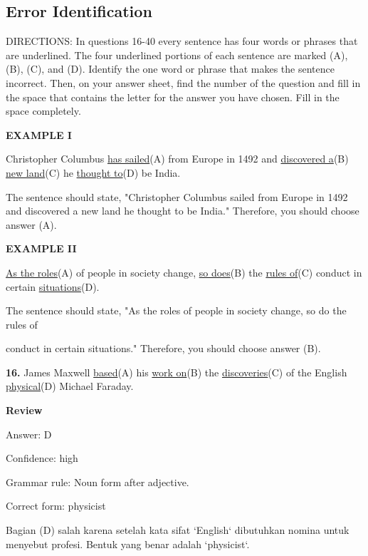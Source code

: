 \documentclass[12pt]{article}
\begin{document}
\subsection*{Error Identification}
DIRECTIONS: In questions 16-40 every sentence has four words or phrases that are underlined. The four underlined portions of each sentence are marked (A), (B), (C), and (D). Identify the one word or phrase that makes the sentence incorrect. Then, on your answer sheet, find the number of the question and fill in the space that contains the letter for the answer you have chosen. Fill in the space completely.\par
\begin{exampleblock}
\textbf{EXAMPLE I}\par
Christopher Columbus \uline{has sailed}(A) from Europe in 1492 and \uline{discovered a}(B) \uline{new land}(C) he \uline{thought to}(D) be India.\par
The sentence should state, "Christopher Columbus sailed from Europe in 1492 and discovered a new land he thought to be India." Therefore, you should choose answer (A).\par
\end{exampleblock}
\begin{exampleblock}
\textbf{EXAMPLE II}\par
\uline{As the roles}(A) of people in society change, \uline{so does}(B) the \uline{rules of}(C) conduct in certain \uline{situations}(D).\par
The sentence should state, "As the roles of people in society change, so do the rules of\par
conduct in certain situations." Therefore, you should choose answer (B).\par
\end{exampleblock}
\noindent\textbf{16.} James Maxwell \uline{based}(A) his \uline{work on}(B) the \uline{discoveries}(C) of the English \uline{physical}(D) Michael Faraday.
\par
\begingroup
\setlength{\parskip}{0pt}
\setlength{\parindent}{0pt}
\textbf{Review}\par
Answer: D\par
Confidence: high\par
Grammar rule: Noun form after adjective.\par
Correct form: physicist\par
Bagian (D) salah karena setelah kata sifat `English` dibutuhkan nomina untuk menyebut profesi. Bentuk yang benar adalah `physicist`.\par
\end{document}

